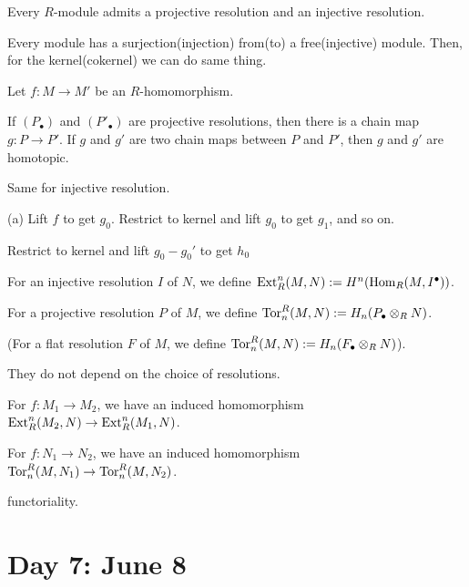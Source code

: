 \documentclass{../../small}
\begin{document}
\begin{prop*}[2.4.2]
Every $R$-module admits a projective resolution and an injective resolution.
\end{prop*}
\begin{pf}
Every module has a surjection(injection) from(to) a free(injective) module.
Then, for the kernel(cokernel) we can do same thing.
\end{pf}
\begin{prop*}[2.4.3]
Let $f:M\to M'$ be an $R$-homomorphism.
\begin{parts}
\item If $(P_\bullet)$ and $(P'_\bullet)$ are projective resolutions, then there is a chain map $g:P\to P'$. If $g$ and $g'$ are two chain maps between $P$ and $P'$, then $g$ and $g'$ are homotopic.
\item Same for injective resolution.
\end{parts}
\end{prop*}
\begin{pf}
(a) Lift $f$ to get $g_0$. Restrict to kernel and lift $g_0$ to get $g_1$, and so on.

Restrict to kernel and lift $g_0-g_0'$ to get $h_0$
\end{pf}

For an injective resolution $I$ of $N$, we define $\operatorname{Ext}_R^n(M,N):=H^n(\operatorname{Hom}_R(M,I^\bullet))$.

For a projective resolution $P$ of $M$, we define $\operatorname{Tor}_n^R(M,N):=H_n(P_\bullet\otimes_RN)$.

(For a flat resolution $F$ of $M$, we define $\operatorname{Tor}_n^R(M,N):=H_n(F_\bullet\otimes_RN)$).

They do not depend on the choice of resolutions.

For $f:M_1\to M_2$, we have an induced homomorphism $\operatorname{Ext}_R^n(M_2,N)\to\operatorname{Ext}_R^n(M_1,N)$.

For $f:N_1\to N_2$, we have an induced homomorphism $\operatorname{Tor}_n^R(M,N_1)\to\operatorname{Tor}_n^R(M,N_2)$.

functoriality.


\newpage
\section{Day 7: June 8}
\end{document}
